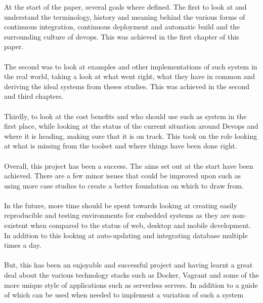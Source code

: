 At the start of the paper, several goals where defined. The first to look at and understand the terminology, history and meaning behind the various forms of continuous integration, continuous deployment and automatic build and the surrounding culture of devops. This was achieved in the first chapter of this paper.
\\\\
The second was to look at examples and other implementations of such system in the real world, taking a look at what went right, what they have in common and deriving the ideal systems from theses studies. This was achieved in the second and third chapters.
\\\\
Thirdly, to look at the cost benefits and who should use such as system in the first place, while looking at the status of the current situation around Devops and where it is heading, making sure that it is on track. This took on the role looking at what is missing from the toolset and where things have been done right.
\\\\
Overall, this project has been a success. The aims set out at the start have been achieved. There are a few minor issues that could be improved upon such as using more case studies to create a better foundation on which to draw from. 
\\\\
In the future, more time should be spent towards looking at creating easily reproducible and testing environments for embedded systems as they are non-existent when compared to the status of web, desktop and mobile development. In addition to this looking at auto-updating and integrating database multiple times a day.
\\\\
But, this has been an enjoyable and successful project and having learnt a great deal about the various technology stacks such as Docker, Vagrant and some of the more unique style of applications such as serverless servers. In addition to a guide of which can be used when needed to implement a variation of such a system